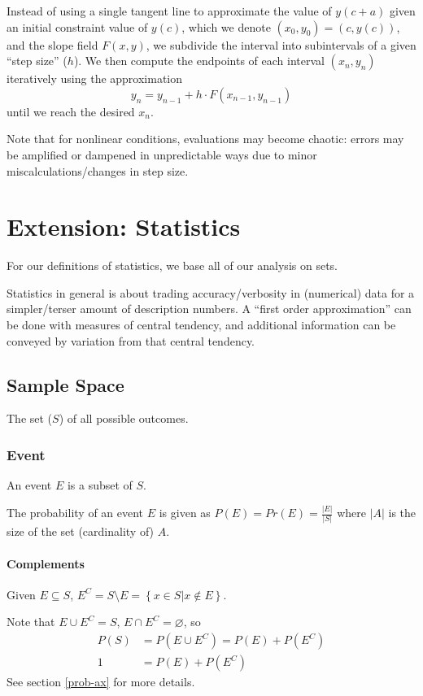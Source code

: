 \documentclass{article}
\begin{document}
Instead of using a single tangent line to approximate the value of $y(c+a)$ given an initial constraint value of $y(c)$, which we denote $(x_0,y_0)=(c,y(c))$, and the slope field $F(x,y)$, we subdivide the interval into subintervals of a given ``step size'' ($h$).  We then compute the endpoints of each interval $(x_n,y_n)$ iteratively using the approximation $$y_n=y_{n-1}+h\cdot F\left(x_{n-1},y_{n-1}\right)$$ until we reach the desired $x_n$.

Note that for nonlinear conditions, evaluations may become chaotic: errors may be amplified or dampened in unpredictable ways due to minor miscalculations/changes in step size.

\section{Extension: Statistics}
For our definitions of statistics, we base all of our analysis on sets.

Statistics in general is about trading accuracy/verbosity in (numerical) data for a simpler/terser amount of description numbers. A ``first order approximation'' can be done with measures of central tendency, and additional information can be conveyed by variation from that central tendency.

\subsection{Sample Space}
The set ($S$) of all possible outcomes.
\subsubsection{Event} An event $E$ is a subset of $S$.

The probability of an event $E$ is given as $P(E)=Pr(E)=\frac{|E|}{|S|}$ where $|A|$ is the size of the set (cardinality of) $A$.

\paragraph{Complements}
Given $E \subseteq S$, $E^C= S \setminus E = \left\{x \in S | x \notin E\right\}$.

Note that $E \cup E^C = S$, $E \cap E^C = \varnothing$, so
\begin{align*}
    P(S) &= P(E \cup E^C) = P(E) + P(E^C) \\
    1 &= P(E) + P(E^C)
\end{align*}
See section \ref{prob-ax} for more details.
\end{document}
